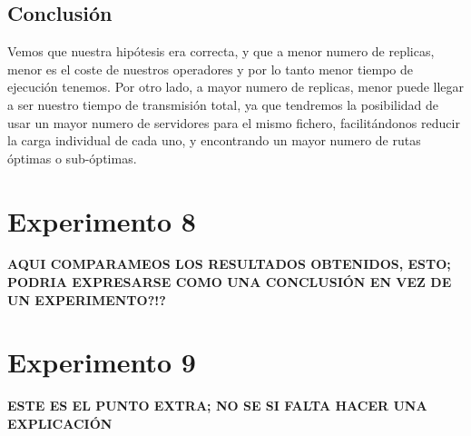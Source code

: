 \documentclass[a4paper,10pt]{report}
\begin{document}
		\subsection*{Conclusión}
		Vemos que nuestra hipótesis era correcta, y que a menor numero de replicas, menor es el coste de nuestros operadores y por lo tanto menor tiempo de ejecución tenemos. Por otro lado, a mayor numero de replicas, menor puede llegar a ser nuestro tiempo de transmisión total, ya que tendremos la posibilidad de usar un mayor numero de servidores para el mismo fichero, facilitándonos reducir la carga individual de cada uno, y encontrando un mayor numero de rutas óptimas o sub-óptimas.
		
		
	\newpage
	\section*{Experimento 8}

		\textbf{AQUI COMPARAMEOS LOS RESULTADOS OBTENIDOS, ESTO;  PODRIA EXPRESARSE
		        COMO UNA CONCLUSIÓN EN VEZ DE UN EXPERIMENTO?!?}
		        

	\newpage
	\section*{Experimento 9}

		\textbf{ESTE ES EL PUNTO EXTRA; NO SE SI FALTA HACER UNA EXPLICACIÓN}
\end{document}
